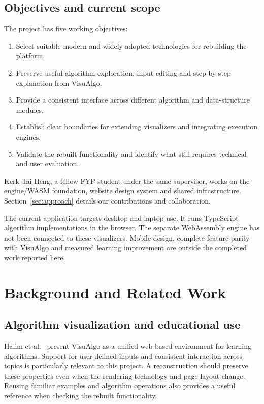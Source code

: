 \documentclass[11pt,a4paper]{article}
\newcommand{\page}{\par\vspace{8pt}}
\begin{document}
\subsection{Objectives and current scope}
The project has five working objectives:
\begin{enumerate}
\item Select suitable modern and widely adopted technologies for rebuilding the platform.
\item Preserve useful algorithm exploration, input editing and step-by-step explanation from VisuAlgo.
\item Provide a consistent interface across different algorithm and data-structure modules.
\item Establish clear boundaries for extending visualizers and integrating execution engines.
\item Validate the rebuilt functionality and identify what still requires technical and user evaluation.
\end{enumerate}

Kerk Tai Heng, a fellow FYP student under the same supervisor, works on the engine/WASM foundation, website design system and shared infrastructure. Section~\ref{sec:approach} details our contributions and collaboration.

The current application targets desktop and laptop use. It runs TypeScript algorithm implementations in the browser. The separate WebAssembly engine has not been connected to these visualizers. Mobile design, complete feature parity with VisuAlgo and measured learning improvement are outside the completed work reported here.

\endgroup
\page
\section{Background and Related Work}
\subsection{Algorithm visualization and educational use}
Halim et al.~\cite{halim2012} present VisuAlgo as a unified web-based environment for learning algorithms. Support for user-defined inputs and consistent interaction across topics is particularly relevant to this project. A reconstruction should preserve these properties even when the rendering technology and page layout change. Reusing familiar examples and algorithm operations also provides a useful reference when checking the rebuilt functionality.
\end{document}
